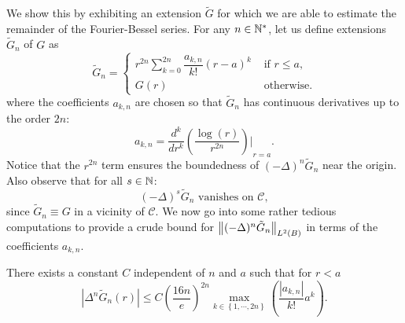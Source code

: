 \documentclass{article}
\begin{document}
We show this by exhibiting an extension $\tilde{G}$ for which we are able to estimate the remainder of the Fourier-Bessel series.
For any $n \in \mathbb{N}^{*}$, let us define extensions $\tilde{G}_n$ of $G$ as
\begin{equation}
	\tilde{G}_n = \begin{cases}
	r^{2n}\sum_{k=0}^{2n} \dfrac{a_{k,n}}{k!}(r-a)^k &\text{ if }r \leq a, \\
	G(r) &\text{ otherwise.}
	\end{cases}
\end{equation}
where the coefficients $a_{k,n}$ are chosen so that $\tilde{G}_n$ has continuous derivatives up to the order $2n$:
\[a_{k,n} = {\dfrac{d^k}{dr^k}\left(\dfrac{\log(r)}{r^{2n}}\right)\bigg|}_{r=a}.\]
Notice that the $r^{2n}$ term ensures the boundedness of $(-\Delta)^n \tilde{G}_n$ near the origin. Also observe that for all $s \in \mathbb{N}$:
\[(-\Delta)^s \tilde{G}_n \text{ vanishes on } \mathcal{C},\]
since $\tilde{G}_n \equiv G$ in a vicinity of $\mathcal{C}$. 
We now go into some rather tedious computations to provide a crude bound for $\left\|(-\Delta)^n \tilde{G}_n\right\|_{L^2(B)}$ in terms of the coefficients $a_{k,n}$.
																		
\begin{lemma} 
	\label{LemmeDegueu}
	There exists a constant $C$ independent of $n$ and $a$ such that for $r<a$
	\begin{equation}
		\left|\Delta^n \tilde{G}_n(r)\right| \leq  C \left( \frac{16n}{e}\right)^{2n}\!\!\!\!\!\max_{k\in \left\{1,\cdots,2n\right\}}\left(\dfrac{|a_{k,n}|}{k!}a^k\right).
		\label{bigBadEq1Reduced}
	\end{equation}
	\label{LemAkDeltanf}
\end{lemma}
																		
\end{document}
